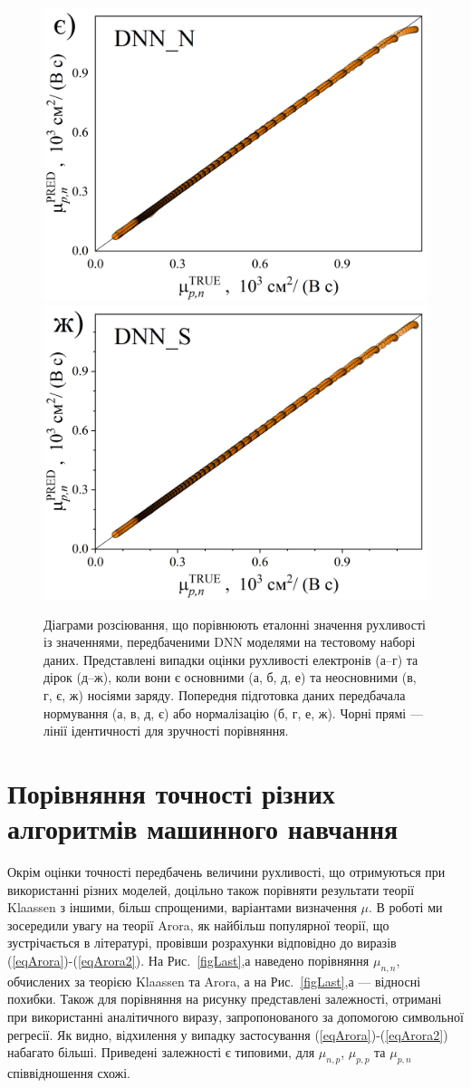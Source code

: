 \documentclass[12pt,a4paper,titlepage,oneside]{book}
\numberwithin{equation}{part}
\begin{document}
\begin{figure}
     \includegraphics[width=0.35\linewidth]{DNNNpn.png}\kern 20pt
     \includegraphics[width=0.35\linewidth]{DNNSpn.png}
	  \caption{Діаграми розсіювання, що порівнюють еталонні значення рухливості із значеннями, передбаченими DNN моделями
       на тестовому наборі даних.
       Представлені випадки оцінки рухливості електронів (а--г) та дірок (д--ж), коли вони є
       основними (а, б, д, е) та неосновними (в, г, є, ж) носіями заряду.
       Попередня підготовка даних передбачала нормування (а, в, д, є) або нормалізацію (б, г, е, ж).
       Чорні прямі --- лінії ідентичності для зручності порівняння.
}\label{figDNN}
\end{figure}



\section{Порівняння точності різних алгоритмів машинного навчання}

Окрім оцінки точності передбачень величини рухливості, що отримуються при використанні різних моделей,
доцільно також порівняти результати теорії Klaassen з іншими, більш спрощеними, варіантами визначення $\mu$.
В роботі ми зосередили увагу на теорії Arora, як найбільш популярної теорії, що зустрічається в літературі,
провівши розрахунки відповідно до виразів (\ref{eqArora})-(\ref{eqArora2}).
На Рис.~\ref{figLast},а наведено порівняння $\mu_{n,n}$, обчислених за теорією  Klaassen та Arora,
а на Рис.~\ref{figLast},а --- відносні похибки.
Також для порівняння на рисунку представлені залежності, отримані при використанні 
аналітичного виразу, запропонованого за допомогою символьної регресії.
Як видно, відхилення у випадку застосування (\ref{eqArora})-(\ref{eqArora2}) набагато більші.
Приведені залежності є типовими, для $\mu_{n,p}$, $\mu_{p,p}$ та $\mu_{p,n}$ співвідношення схожі.
\end{document}
